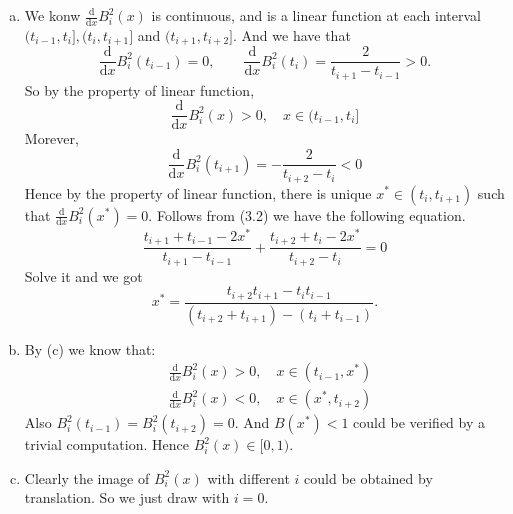 \documentclass[11pt]{elegantbook}
\begin{document}
\begin{solution}
\begin{enumerate}[(a)]
    \item We konw $\frac{\text{d}}{\text{d}x}B_i^2(x)$ is continuous, and is a linear function at each interval $(t_{i-1},t_i],(t_{i},t_{i+1}]$ and $(t_{i+1},t_{i+2}]$. And we have that
    \begin{equation*}
      \frac{\text{d}}{\text{d}x}B_i^2(t_{i-1})=0,\qquad \frac{\text{d}}{\text{d}x}B_i^2(t_i)=\frac{2}{t_{i+1}-t_{i-1}}>0.
    \end{equation*}
    So by the property of linear function, 
    \begin{equation*}
      \frac{\text{d}}{\text{d}x}B_i^2(x)>0, \quad x\in(t_{i-1},t_i]
    \end{equation*}
    Morever, 
    \begin{equation*}
      \frac{\text{d}}{\text{d}x}B_i^2(t_{i+1})=-\frac{2}{t_{i+2}-t_i}<0
    \end{equation*}
    Hence by the property of linear function, there is unique $x^*\in(t_{i},t_{i+1})$ such that $\frac{\text{d}}{\text{d}x}B_i^2(x^*)=0$. Follows from (3.2) we have the following equation.
    \begin{equation*}
      \frac{t_{i+1}+t_{i-1}-2x^*}{t_{i+1}-t_{i-1}}+\frac{t_{i+2}+t_i-2x^*}{t_{i+2}-t_i}=0
    \end{equation*}
    Solve it and we got
    \begin{equation*}
      x^*=\frac{t_{i+2}t_{i+1}-t_it_{i-1}}{(t_{i+2}+t_{i+1})-(t_i+t_{i-1})}.
    \end{equation*}
  
    \item By (c) we know that:
    \begin{align*}
      &\frac{\text{d}}{\text{d}x}B_i^2(x)>0, \quad x\in(t_{i-1},x^*)\\
      &\frac{\text{d}}{\text{d}x}B_i^2(x)<0, \quad x\in(x^*,t_{i+2})
    \end{align*}
    Also $B_i^2(t_{i-1})=B_i^2(t_{i+2})=0$. And $B(x^*)<1$ could be verified by a trivial computation. Hence $B_i^2(x)\in[0,1)$. 
  
    \item Clearly the image of $B_i^2(x)$ with different $i$ could be obtained by translation. So we just draw with $i=0$.
  \begin{center}
  \end{center}
  \end{enumerate}
\end{solution}
\end{document}
